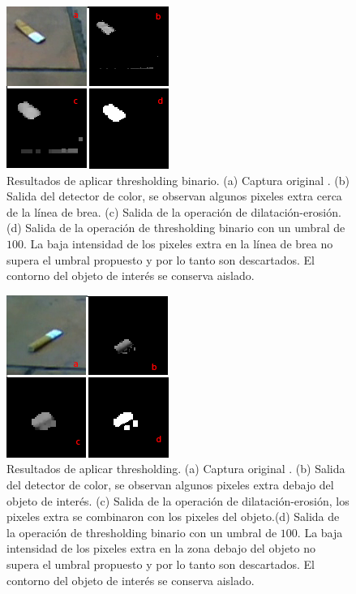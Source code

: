 \begin{figure}[tpb]
\begin{center}
  \includegraphics[scale=0.8]{figuras/threshold-ruido.png}
\end{center}
 \caption{\small Resultados de aplicar thresholding binario. (a) Captura original . (b) Salida del detector de color, se observan algunos pixeles extra cerca de la línea de brea. (c) Salida de la operación de dilatación-erosión. (d) Salida de la operación de thresholding binario con un umbral de $100$. La baja intensidad de los pixeles extra en la línea de brea no supera el umbral propuesto y por lo tanto son descartados. El contorno del objeto de interés se conserva aislado.} 
  \label{fig:threshold_ruido}
\end{figure}

\begin{figure}[tpb]
\begin{center}
  \includegraphics[scale=0.8]{figuras/threshold.png}
\end{center}
  \caption{\small Resultados de aplicar thresholding. (a) Captura original . (b) Salida del detector de color, se observan algunos pixeles extra debajo del objeto de interés. (c) Salida de la operación de dilatación-erosión, los pixeles extra se combinaron con los pixeles del objeto.(d) Salida de la operación de thresholding binario con un umbral de $100$. La baja intensidad de los pixeles extra en la zona debajo del objeto no supera el umbral propuesto y por lo tanto son descartados. El contorno del objeto de interés se conserva aislado.} 
  \label{fig:threshold}
\end{figure}

